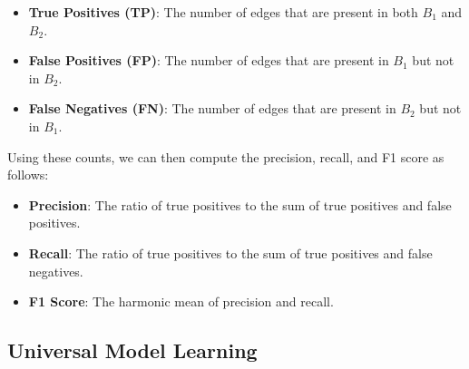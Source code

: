 \begin{itemize}
      \item \textbf{True Positives (TP)}: The number of edges that are present in both $B_1$ and $B_2$.
      \item \textbf{False Positives (FP)}: The number of edges that are present in $B_1$ but not in $B_2$.
      \item \textbf{False Negatives (FN)}: The number of edges that are present in $B_2$ but not in $B_1$.
\end{itemize}

Using these counts, we can then compute the precision, recall, and F1 score as follows:

\begin{itemize}
      \item \textbf{Precision}: The ratio of true positives to the sum of true positives and false positives.
      \item \textbf{Recall}: The ratio of true positives to the sum of true positives and false negatives.
      \item \textbf{F1 Score}: The harmonic mean of precision and recall.
\end{itemize}


\subsection{Universal Model Learning}

